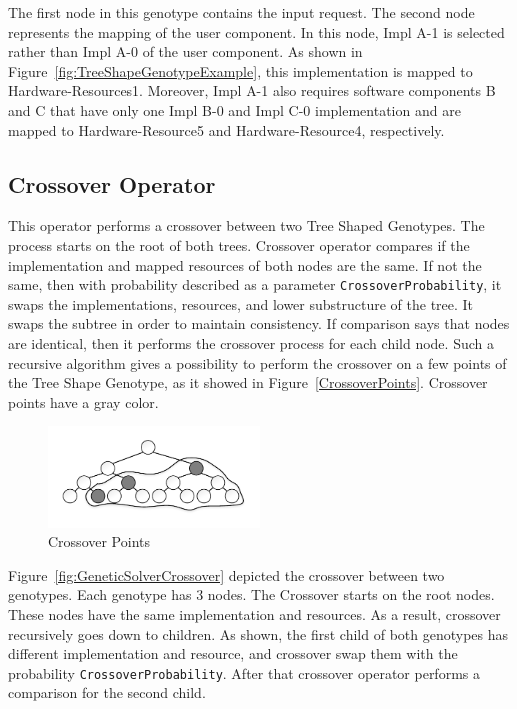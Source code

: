 The first node in this genotype contains the input request. The second node represents the mapping of the user component. In this node, Impl A-1 is selected rather than Impl A-0 of the user component. As shown in Figure~\ref{fig:TreeShapeGenotypeExample}, this implementation is mapped to Hardware-Resources1. Moreover, Impl A-1 also requires software components B and C that have only one Impl B-0 and Impl C-0 implementation and are mapped to Hardware-Resource5 and Hardware-Resource4, respectively.

\subsection{Crossover Operator}
\label{sec:GeneticSolverCrossover}

This operator performs a crossover between two Tree Shaped Genotypes. The process starts on the root of both trees. Crossover operator compares if the implementation and mapped resources of both nodes are the same. If not the same, then with probability described as a parameter \texttt{CrossoverProbability}, it swaps the implementations, resources, and lower substructure of the tree. It swaps the subtree in order to maintain consistency. If comparison says that nodes are identical, then it performs the crossover process for each child node. Such a recursive algorithm gives a possibility to perform the crossover on a few points of the Tree Shape Genotype, as it showed in Figure~\ref{CrossoverPoints}. Crossover points have a gray color.

\begin{figure}
	\centering
	\includegraphics[width=0.5\textwidth]{images/CrossoverPoints.pdf}
	\caption[Crossover Points]{Crossover Points}
	\label{fig:CrossoverPoints}
\end{figure}

Figure~\ref{fig:GeneticSolverCrossover} depicted the crossover between two genotypes. Each genotype has 3 nodes. The Crossover starts on the root nodes. These nodes have the same implementation and resources. As a result, crossover recursively goes down to children. As shown, the first child of both genotypes has different implementation and resource, and crossover swap them with the probability \texttt{CrossoverProbability}. After that crossover operator performs a comparison for the second child.



